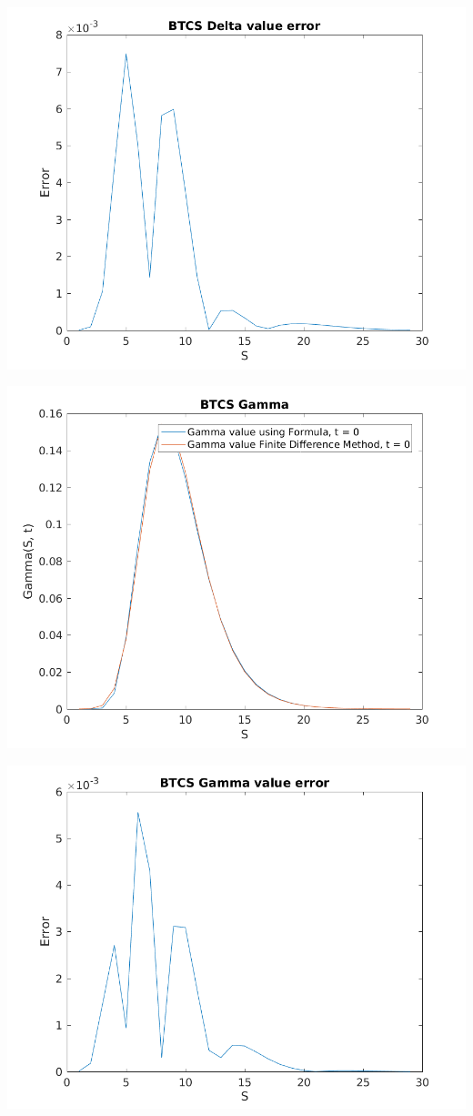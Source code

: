 \documentclass{article}
\begin{document}
\includegraphics{"q1_18"}
\pagebreak


\includegraphics{"q1_19"}
\pagebreak


\includegraphics{"q1_20"}
\pagebreak
\end{document}
